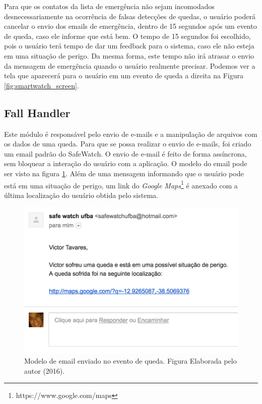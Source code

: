 Para que os contatos da lista de emergência não sejam incomodados desnecessariamente na ocorrência de falsas detecções de quedas, o usuário poderá cancelar o envio dos emails de emergência, dentro de 15 segundos após um evento de queda, caso ele informe que está bem. O tempo de 15 segundos foi escolhido, pois o usuário terá tempo de dar um feedback para o sistema, caso ele não esteja em uma situação de perigo. Da mesma forma, este tempo não irá atrasar o envio da mensagem de emergência quando o usuário realmente precisar. Podemos ver a tela que aparecerá para o usuário em um evento de queda a direita na Figura \ref{fig:smartwatch_screen}. 



\subsection{Fall Handler} 
Este módulo é responsável pelo envio de e-mails e a manipulação de arquivos com os dados de uma queda. Para que se possa realizar o envio de e-mails, foi criado um email padrão do SafeWatch. O envio de e-mail é feito de forma assíncrona, sem bloquear a interação do usuário com a aplicação. O modelo do email pode ser visto na figura \ref{fig:mail_template}. Além de uma mensagem informando que o usuário pode está em uma situação de perigo, um link do \textit{Google Maps}\footnote{https://www.google.com/maps} é anexado com a última localização do usuário obtida pelo sistema.

\begin{figure}[ht]
	\centering
	\includegraphics[scale=0.7]{imagens/mail_example.png}
	\caption{ Modelo de email enviado no evento de queda. Figura Elaborada pelo autor (2016).}
	\label{fig:mail_template}
\end{figure}


